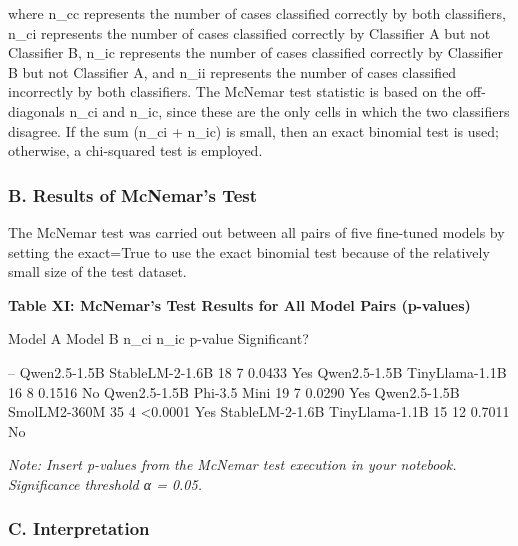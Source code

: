 where n\_cc represents the number of cases classified correctly by both
classifiers, n\_ci represents the number of cases classified correctly
by Classifier A but not Classifier B, n\_ic represents the number of
cases classified correctly by Classifier B but not Classifier A, and
n\_ii represents the number of cases classified incorrectly by both
classifiers. The McNemar test statistic is based on the off-diagonals
n\_ci and n\_ic, since these are the only cells in which the two
classifiers disagree. If the sum (n\_ci + n\_ic) is small, then an exact
binomial test is used; otherwise, a chi-squared test is employed.

\subsubsection{B. Results of McNemar's
Test}\label{b.-results-of-mcnemars-test}

The McNemar test was carried out between all pairs of five fine-tuned
models by setting the exact=True to use the exact binomial test because
of the relatively small size of the test dataset.

\textbf{Table XI: McNemar's Test Results for All Model Pairs (p-values)}

Model A \textbar{} Model B \textbar{} n\_ci \textbar{} n\_ic \textbar{}
p-value \textbar{} Significant? \textbar{}

\textbar\textbar\textbar\textbar\textbar\textbar--\textbar{} \textbar{}
Qwen2.5-1.5B \textbar{} StableLM-2-1.6B \textbar{} 18 \textbar{} 7
\textbar{} 0.0433 \textbar{} Yes \textbar{} \textbar{} Qwen2.5-1.5B
\textbar{} TinyLlama-1.1B \textbar{} 16 \textbar{} 8 \textbar{} 0.1516
\textbar{} No \textbar{} \textbar{} Qwen2.5-1.5B \textbar{} Phi-3.5 Mini
\textbar{} 19 \textbar{} 7 \textbar{} 0.0290 \textbar{} Yes \textbar{}
\textbar{} Qwen2.5-1.5B \textbar{} SmolLM2-360M \textbar{} 35 \textbar{}
4 \textbar{} \textless0.0001 \textbar{} Yes \textbar{} \textbar{}
StableLM-2-1.6B\textbar{} TinyLlama-1.1B \textbar{} 15 \textbar{} 12
\textbar{} 0.7011 \textbar{} No \textbar{}

\emph{Note: Insert p-values from the McNemar test execution in your
notebook. Significance threshold α = 0.05.}

\subsubsection{C. Interpretation}\label{c.-interpretation}

